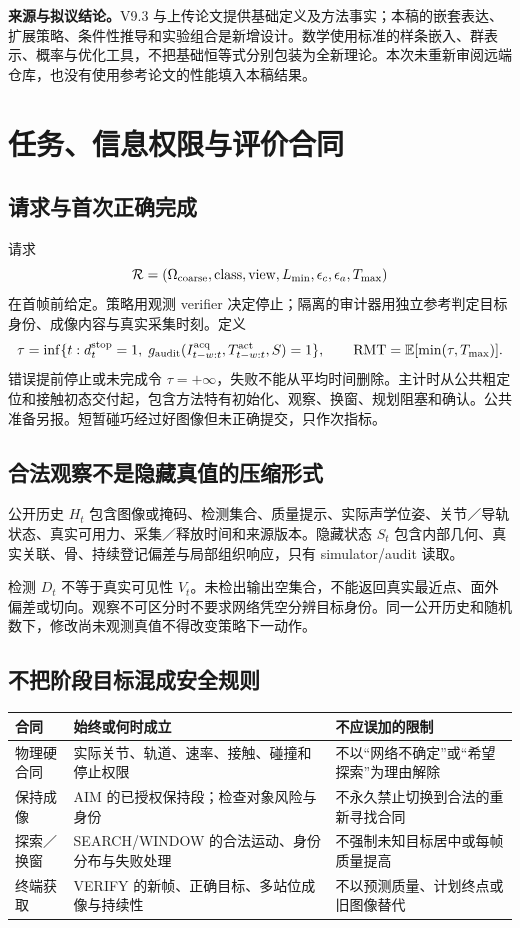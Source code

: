 \documentclass[UTF8,fontset=fandol,11pt,a4paper]{ctexart}
\theoremstyle{plain}
\theoremstyle{definition}
\theoremstyle{remark}
\numberwithin{equation}{section}
\newcommand{\E}{\mathbb E}
\newcommand{\cR}{\mathcal R}
\begin{document}
\begin{scopebox}
\textbf{来源与拟议结论。}V9.3 与上传论文提供基础定义及方法事实；本稿的嵌套表达、扩展策略、条件性推导和实验组合是新增设计。数学使用标准的样条嵌入、群表示、概率与优化工具，不把基础恒等式分别包装为全新理论。本次未重新审阅远端仓库，也没有使用参考论文的性能填入本稿结果。
\end{scopebox}

\section{任务、信息权限与评价合同}
\label{sec:contract}
\subsection{请求与首次正确完成}
请求
\begin{equation}
\cR=(\Omega_{\rm coarse},\mathrm{class},\mathrm{view},L_{\min},\epsilon_c,\epsilon_a,T_{\max})
\end{equation}
在首帧前给定。策略用观测 verifier 决定停止；隔离的审计器用独立参考判定目标身份、成像内容与真实采集时刻。定义
\begin{equation}
\tau=\inf\{t:d_t^{\rm stop}=1,\;g_{\rm audit}(I_{t-w:t}^{\rm acq},T_{t-w:t}^{\rm act},S)=1\},
\qquad \mathrm{RMT}=\E[\min(\tau,T_{\max})].
\label{eq:rmt}
\end{equation}
错误提前停止或未完成令 $\tau=+\infty$，失败不能从平均时间删除。主计时从公共粗定位和接触初态交付起，包含方法特有初始化、观察、换窗、规划阻塞和确认。公共准备另报。短暂碰巧经过好图像但未正确提交，只作次指标。

\subsection{合法观察不是隐藏真值的压缩形式}
公开历史 $H_t$ 包含图像或掩码、检测集合、质量提示、实际声学位姿、关节／导轨状态、真实可用力、采集／释放时间和来源版本。隐藏状态 $S_t$ 包含内部几何、真实关联、骨、持续登记偏差与局部组织响应，只有 simulator/audit 读取。

检测 $D_t$ 不等于真实可见性 $V_t$。未检出输出空集合，不能返回真实最近点、面外偏差或切向。观察不可区分时不要求网络凭空分辨目标身份。同一公开历史和随机数下，修改尚未观测真值不得改变策略下一动作。

\subsection{不把阶段目标混成安全规则}
\begin{longtable}{P{25mm}P{54mm}P{67mm}}
\toprule 合同 & 始终或何时成立 & 不应误加的限制\\\midrule\endhead
物理硬合同 & 实际关节、轨道、速率、接触、碰撞和停止权限 & 不以“网络不确定”或“希望探索”为理由解除\\
保持成像 & AIM 的已授权保持段；检查对象风险与身份 & 不永久禁止切换到合法的重新寻找合同\\
探索／换窗 & SEARCH/WINDOW 的合法运动、身份分布与失败处理 & 不强制未知目标居中或每帧质量提高\\
终端获取 & VERIFY 的新帧、正确目标、多站位成像与持续性 & 不以预测质量、计划终点或旧图像替代\\\bottomrule
\end{longtable}
\end{document}
